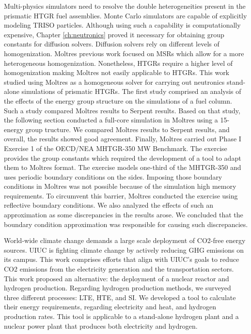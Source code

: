 Multi-physics simulators need to resolve the double heterogeneities present in the prismatic HTGR fuel assemblies.
Monte Carlo simulators are capable of explicitly modeling TRISO particles.
Although using such a capability is computationally expensive, Chapter \ref{ch:neutronics} proved it necessary for obtaining group constants for diffusion solvers.
Diffusion solvers rely on different levels of homogenization.
Moltres previous work focused on MSRs which allow for a more heterogeneous homogenization.
Nonetheless, HTGRs require a higher level of homogenization making Moltres not easily applicable to HTGRs.
This work studied using Moltres as a homogeneous solver for carrying out neutronics stand-alone simulations of prismatic HTGRs.
The first study comprised an analysis of the effects of the energy group structure on the simulations of a fuel column.
Such a study compared Moltres results to Serpent results.
Based on that study, the following section conducted a full-core simulation in Moltres using a 15-energy group tructure.
We compared Moltres results to Serpent results, and overall, the results showed good agreement.
Finally, Moltres carried out Phase I Exercise 1 of the OECD/NEA MHTGR-350 MW Benchmark.
The exercise provides the group constants which required the development of a tool to adapt them to Moltres format.
The exercise models one-third of the MHTGR-350 and uses periodic boundary conditions on the sides.
Imposing those boundary conditions in Moltres was not possible because of the simulation high memory requirements.
To circumvent this barrier, Moltres conducted the exercise using reflective boundary conditions.
We also analyzed the effects of such an approximation as some discrepancies in the results arose.
We concluded that the boundary condition approximation was responsible for causing such discrepancies.



World-wide climate change demands a large scale deployment of \gls{CO2}-free energy sources.
UIUC is fighting climate change by actively reducing GHG emissions on its campus.
This work comprises efforts that align with UIUC's goals to reduce \gls{CO2} emissions from the electricity generation and the transportation sectors.
This work proposed an alternative: the deployment of a nuclear reactor and hydrogen production.
Regarding hydrogen production methods, we surveyed three different processes: LTE, HTE, and SI.
We developed a tool to calculate their energy requirements, regarding electricity and heat, and hydrogen production rates.
This tool is applicable to a stand-alone hydrogen plant and a nuclear power plant that produces both electricity and hydrogen.

